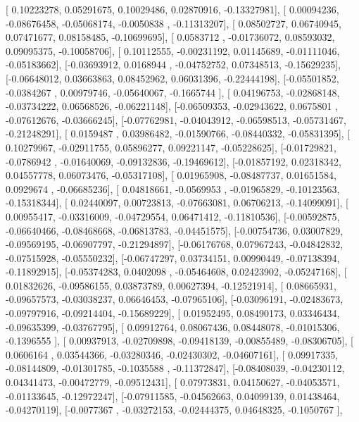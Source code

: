 \documentclass{article}
\begin{document}
       [ 0.10223278,  0.05291675,  0.10029486,  0.02870916, -0.13327981],
       [ 0.00094236, -0.08676458, -0.05068174, -0.0050838 , -0.11313207],
       [ 0.08502727,  0.06740945,  0.07471677,  0.08158485, -0.10699695],
       [ 0.0583712 , -0.01736072,  0.08593032,  0.09095375, -0.10058706],
       [ 0.10112555, -0.00231192,  0.01145689, -0.01111046, -0.05183662],
       [-0.03693912,  0.0168944 , -0.04752752,  0.07348513, -0.15629235],
       [-0.06648012,  0.03663863,  0.08452962,  0.06031396, -0.22444198],
       [-0.05501852, -0.0384267 ,  0.00979746, -0.05640067, -0.1665744 ],
       [ 0.04196753, -0.02868148, -0.03734222,  0.06568526, -0.06221148],
       [-0.06509353, -0.02943622,  0.0675801 , -0.07612676, -0.03666245],
       [-0.07762981, -0.04043912, -0.06598513, -0.05731467, -0.21248291],
       [ 0.0159487 ,  0.03986482, -0.01590766, -0.08440332, -0.05831395],
       [ 0.10279967, -0.02911755,  0.05896277,  0.09221147, -0.05228625],
       [-0.01729821, -0.0786942 , -0.01640069, -0.09132836, -0.19469612],
       [-0.01857192,  0.02318342,  0.04557778,  0.06073476, -0.05317108],
       [ 0.01965908, -0.08487737,  0.01651584,  0.0929674 , -0.06685236],
       [ 0.04818661, -0.0569953 , -0.01965829, -0.10123563, -0.15318344],
       [ 0.02440097,  0.00723813, -0.07663081,  0.06706213, -0.14099091],
       [ 0.00955417, -0.03316009, -0.04729554,  0.06471412, -0.11810536],
       [-0.00592875, -0.06640466, -0.08468668, -0.06813783, -0.04451575],
       [-0.00754736,  0.03007829, -0.09569195, -0.06907797, -0.21294897],
       [-0.06176768,  0.07967243, -0.04842832, -0.07515928, -0.05550232],
       [-0.06747297,  0.03734151,  0.00990449, -0.07138394, -0.11892915],
       [-0.05374283,  0.0402098 , -0.05464608,  0.02423902, -0.05247168],
       [ 0.01832626, -0.09586155,  0.03873789,  0.00627394, -0.12521914],
       [ 0.08665931, -0.09657573, -0.03038237,  0.06646453, -0.07965106],
       [-0.03096191, -0.02483673, -0.09797916, -0.09214404, -0.15689229],
       [ 0.01952495,  0.08490173,  0.03346434, -0.09635399, -0.03767795],
       [ 0.09912764,  0.08067436,  0.08448078, -0.01015306, -0.1396555 ],
       [ 0.00937913, -0.02709898, -0.09418139, -0.00855489, -0.08306705],
       [ 0.0606164 ,  0.03544366, -0.03280346, -0.02430302, -0.04607161],
       [ 0.09917335, -0.08144809, -0.01301785, -0.1035588 , -0.11372847],
       [-0.08408039, -0.04230112,  0.04341473, -0.00472779, -0.09512431],
       [ 0.07973831,  0.04150627, -0.04053571, -0.01133645, -0.12972247],
       [-0.07911585, -0.04562663,  0.04099139,  0.01438464, -0.04270119],
       [-0.0077367 , -0.03272153, -0.02444375,  0.04648325, -0.1050767 ],
\end{document}
